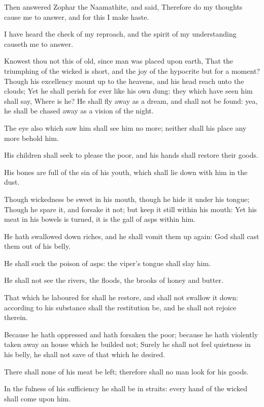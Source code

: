 \Chapter
\Verse Then answered Zophar the Naamathite, and said, \Verse Therefore do my thoughts cause me to answer, and for this I make haste.

\Verse I have heard the check of my reproach, and the spirit of my understanding causeth me to answer.

\Verse Knowest thou not this of old, since man was placed upon earth, \Verse That the triumphing of the wicked is short, and the joy of the hypocrite but for a moment?  \Verse Though his excellency mount up to the heavens, and his head reach unto the clouds; \Verse Yet he shall perish for ever like his own dung: they which have seen him shall say, Where is he?  \Verse He shall fly away as a dream, and shall not be found: yea, he shall be chased away as a vision of the night.

\Verse The eye also which saw him shall see him no more; neither shall his place any more behold him.

\Verse His children shall seek to please the poor, and his hands shall restore their goods.

\Verse His bones are full of the sin of his youth, which shall lie down with him in the dust.

\Verse Though wickedness be sweet in his mouth, though he hide it under his tongue; \Verse Though he spare it, and forsake it not; but keep it still within his mouth: \Verse Yet his meat in his bowels is turned, it is the gall of asps within him.

\Verse He hath swallowed down riches, and he shall vomit them up again: God shall cast them out of his belly.

\Verse He shall suck the poison of asps: the viper's tongue shall slay him.

\Verse He shall not see the rivers, the floods, the brooks of honey and butter.

\Verse That which he laboured for shall he restore, and shall not swallow it down: according to his substance shall the restitution be, and he shall not rejoice therein.

\Verse Because he hath oppressed and hath forsaken the poor; because he hath violently taken away an house which he builded not; \Verse Surely he shall not feel quietness in his belly, he shall not save of that which he desired.

\Verse There shall none of his meat be left; therefore shall no man look for his goods.

\Verse In the fulness of his sufficiency he shall be in straits: every hand of the wicked shall come upon him.

